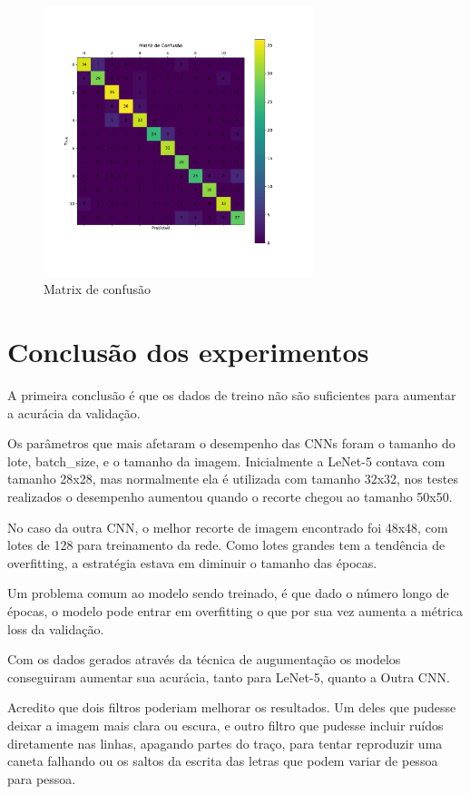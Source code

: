 \documentclass[12pt,
	english,			%
	french,				%
	spanish,			%
	brazil,				%
	]{article}
\begin{document}
\begin{figure}[!htb]
\centering
\includegraphics[width=0.7\textwidth]{images/cm_simple_cnn_augmented.pdf}
\caption{\label{fig:grafico01}Matrix de confusão}
\end{figure}

\clearpage

\section{Conclusão dos experimentos}

A primeira conclusão é que os dados de treino não são suficientes para aumentar a acurácia da validação.

Os parâmetros que mais afetaram o desempenho das CNNs foram o tamanho do lote, batch\_size, e o tamanho da imagem. Inicialmente a LeNet-5 contava com tamanho 28x28, mas normalmente ela é utilizada com tamanho 32x32, nos testes realizados o desempenho aumentou quando o recorte chegou ao tamanho 50x50.

No caso da outra CNN, o melhor recorte de imagem encontrado foi 48x48, com lotes de 128 para treinamento da rede. Como lotes grandes tem a tendência de overfitting, a estratégia estava em diminuir o tamanho das épocas.

Um problema comum ao modelo sendo treinado, é que dado o número longo de épocas, o modelo pode entrar em overfitting o que por sua vez aumenta a métrica loss da validação.

Com os dados gerados através da técnica de augumentação os modelos conseguiram aumentar sua acurácia, tanto para LeNet-5, quanto a Outra CNN.

Acredito que dois filtros poderiam melhorar os resultados. Um deles que pudesse deixar a imagem mais clara ou escura, e outro filtro que pudesse incluir ruídos diretamente nas linhas, apagando partes do traço, para tentar reproduzir uma caneta falhando ou os saltos da escrita das letras que podem variar de pessoa para pessoa.
\end{document}
